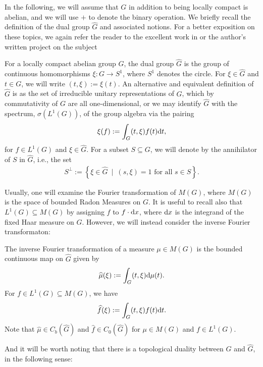 In the following, we will assume that $G$ in addition to being locally compact is abelian, and we will use $+$ to denote the binary operation. We briefly recall the definition of the dual group $\hat G$ and associated notions. For a better exposition on these topics, we again refer the reader to the excellent work in \cite{folland2016fourier} or the author's written project on the subject \cite[Chapter 1-4]{fourierproj}
\begin{definition}
For a locally compact abelian group $G$, the dual group $\hat G$ is the group of continuous homomorphisms $\xi \colon G \to S^1$, where $S^1$ denotes the circle. For $\xi \in \hat G$ and $t \in G$, we will write $(t,\xi) := \xi(t)$. An alternative and equivalent definition of $\hat G$ is as the set of irreducible unitary representations of $G$, which by commutativity of $G$ are all one-dimensional, or we may identify $\hat G$ with the spectrum, $\sigma(L^1(G))$, of the group algebra via the pairing
\begin{align}
	\xi(f):=\int_G (t , \xi) f(t) \mathrm{d} t,
	\label{abel:fourier}
\end{align}
for $f \in L^1(G)$ and $\xi \in \hat G$. For a subset $S \subseteq G$, we will denote by  the annihilator of $S$ in $\hat G$, i.e., the set
\begin{align*}
	S^\perp := \left\{ \xi \in \hat G \ \mid \ (s, \xi) = 1 \text{ for all } s \in S \right\}.
\end{align*}
\end{definition}
Usually, one will examine the Fourier transformation of $M(G)$, where $M(G)$ is the space of bounded Radon Measures on $G$. It is useful to recall also that $L^1(G) \subseteq M(G)$ by assigning $f$ to $f \cdot \mathrm{d} x$, where $\mathrm{d} x$ is the integrand of the fixed Haar measure on $G$. However, we will instead consider the inverse Fourier transformaton:
\begin{definition}
The inverse Fourier transformation of a measure $\mu \in M(G)$ is the bounded continuous map on $\hat G$ given by 
\begin{align*}
\widehat{\mu}(\xi) := \int_G	(t, \xi) \mathrm{d} \mu(t).
\end{align*}
For $f \in L^1(G) \subseteq M(G)$, we have
\begin{align*}
	\widehat{f}(\xi) := \int_G (t, \xi) f(t) \mathrm{d} t.
\end{align*}
Note that $\hat \mu \in C_b(\hat G)$ and $\hat f \in C_0(\hat G)$ for $\mu \in M(G)$ and $f \in L^1(G)$.
\end{definition}
And it will be worth noting that there is a topological duality between $G$ and $\hat G$, in the following sense:

